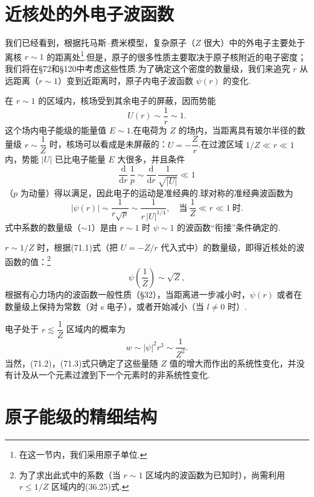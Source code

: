 \section{近核处的外电子波函数}

我们已经看到，根据托马斯–费米模型，复杂原子（$Z$ 很大）中的外电子主要处于离核 $r\sim1$ 的距离处\footnote{在这一节内，我们采用原子单位.}.但是，原子的很多性质主要取决于原子核附近的电子密度；我们将在§72和§120中考虑这些性质.为了确定这个密度的数量级，我们来追究 $r$ 从远距离（$r\sim1$）变到近距离时，原子内电子波函数 $\psi(r)$ 的变化.

在 $r\sim1$ 的区域内，核场受到其余电子的屏蔽，因而势能
\begin{equation*}
  U(r)\sim\frac{1}{r}\sim1.
\end{equation*}
这个场内电子能级的能量值 $E\sim1$.在电荷为 $Z$ 的场内，当距离具有玻尔半径的数量级 $r\sim\dfrac{1}{Z}$ 时，核场可以看成是未屏蔽的：$U=-\dfrac{Z}{r}$.在过渡区域 $1/Z\ll r\ll1$ 内，势能 $|U|$ 已比电子能量 $E$ 大很多，并且条件
\begin{equation*}
  \frac{\mathrm{d}}{\mathrm{d}r}\,\frac{1}{p}\sim\frac{\mathrm{d}}{\mathrm{d}r}\,\frac{1}{\sqrt{|U|}}\ll1
\end{equation*}
（$p$ 为动量）得以满足，因此电子的运动是准经典的.球对称的准经典波函数为
\begin{equation}
  |\psi(r)|\sim\frac{1}{r\sqrt{p}}\sim\frac{1}{r\,|U|^{1/4}},
  \quad\text{当}\ \frac{1}{Z}\ll r\ll1\ \text{时}.
\end{equation}
式中系数的数量级（$\sim1$）是由 $r\sim1$ 时 $\psi\sim1$ 的波函数“衔接”条件确定的.

$r\sim1/Z$ 时，根据(71.1)式（把 $U=-Z/r$ 代入式中）的数量级，即得近核处的波函数的值：\footnote{为了求出此式中的系数（当 $r\sim1$ 区域内的波函数为已知时），尚需利用 $r\leqslant1/Z$ 区域内的(36.25)式.}
\begin{equation}
  \psi\left(\frac{1}{Z}\right)\sim\sqrt{Z},
\end{equation}
根据有心力场内的波函数一般性质（§32），当距离进一步减小时，$\psi(r)$ 或者在数量级上保持为常数（对 s 电子），或者开始减小（当 $l\neq0$ 时）.

电子处于 $r\lesssim\dfrac{1}{Z}$ 区域内的概率为
\begin{equation}
  w\sim|\psi|^{2}r^{3}\sim\frac{1}{Z^{2}}.
\end{equation}
当然，(71.2)，(71.3)式只确定了这些量随 $Z$ 值的增大而作出的系统性变化，并没有计及从一个元素过渡到下一个元素时的非系统性变化.

\section{原子能级的精细结构}

